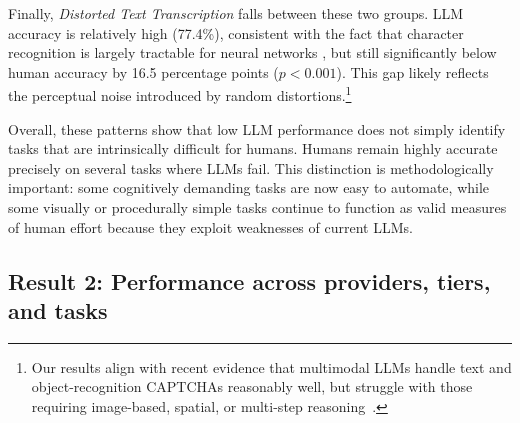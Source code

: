 \documentclass[12pt,a4paper]{article}
\newcommand{\SC}[1]{\textcolor{violet}{SC: #1}}
\begin{document}
Finally, \emph{Distorted Text Transcription} falls between these two groups. LLM accuracy is relatively high (77.4\%), consistent with the fact that character recognition is largely tractable for neural networks \citep{lecun2002gradient}, but still significantly below human accuracy by 16.5 percentage points ($p<0.001$). This gap likely reflects the perceptual noise introduced by random distortions.\footnote{Our results align with recent evidence that multimodal LLMs handle text and object-recognition CAPTCHAs reasonably well, but struggle with those requiring image-based, spatial, or multi-step reasoning~\citep{ding2025illusioncaptcha, wang2025cognition, zhang2025capture}.}

Overall, these patterns show that low LLM performance does not simply identify tasks that are intrinsically difficult for humans. Humans remain highly accurate precisely on several tasks where LLMs fail. This distinction is methodologically important: some cognitively demanding tasks are now easy to automate, while some visually or procedurally simple tasks continue to function as valid measures of human effort because they exploit weaknesses of current LLMs.

\color{black}



\subsection{Result 2: Performance across providers, tiers, and tasks}
\label{sec:capacity}
\end{document}
